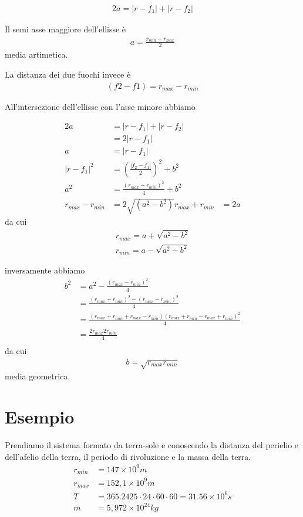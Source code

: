 \documentclass[a4paper,11pt]{article}
\begin{document}
\begin{align*}
	 2a = |r - f_1| + |r - f_2| 
\end{align*}

Il semi asse maggiore dell'ellisse è
\begin{align*}
	a = \frac{r_{min} + r_{max}}{2} 
\end{align*}
media artimetica.

La distanza dei due fuochi invece è
\begin{align*}
	(f2-f1) = r_{max} - r_{min}
\end{align*}

All'intersezione dell'ellisse con l'asse minore abbiamo

\begin{align*}
	2a & = |r - f_1| + |r - f_2| \\
	 & = 2 |r - f_1| \\
	a & = |r - f_1| \\
	|r - f_1|^2&  = (\frac{|f_2 - f_1|}{2})^2 + b^2 \\
	a^2&  = \frac{(r_{max} - r_{min})^2}{4} + b^2 \\
	r_{max} - r_{min} & = 2\sqrt{(a^2-b^2)}
	r_{max} + r_{min} & = 2a
\end{align*}
da cui
\begin{eqnarray}
	\label{rmax} r_{max} = a + \sqrt{a^2-b^2}\\
	\label{rmin} r_{min} = a - \sqrt{a^2-b^2}
\end{eqnarray}

inversamente abbiamo
\begin{align*}
	b^2 & = a^2 - \frac{(r_{max} - r_{min})^2}{4} \\
	 & = \frac{(r_{max} + r_{min})^2 - (r_{max} -r_{min})^2 }{4} \\
	 & = \frac{(r_{max} + r_{min} + r_{max} -r_{min}) (r_{max} + r_{min} - r_{max} +r_{min})^2 }{4} \\
	 & = \frac{2 r_{max} 2 r_{min} }{4} \\
\end{align*}
da cui
\begin{eqnarray}
\label{b1} b = \sqrt{r_{max} r_{min}}
\end{eqnarray}
media geometrica.

\section{Esempio}

Prendiamo il sistema formato da terra-sole e conoscendo la distanza del perielio e dell'afelio della terra, il periodo di rivoluzione e la massa della terra.
\begin{align*}
	r_{min} & = 147 \times 10^9 m \\
	r_{max} & = 152,1 \times 10^9 m \\
	T & = 365.2425 \cdot 24 \cdot 60 \cdot 60 = 31.56 \times 10^6 s\\
	m & = 5,972 \times 10^{24} kg
\end{align*}
\end{document}
